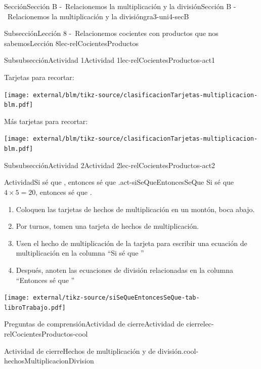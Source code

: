 \begin{sectionptx}{Sección}{Sección B -~Relacionemos la multiplicación y la división}{}{Sección B -~Relacionemos la multiplicación y la división}{}{}{gra3-uni4-secB}
\begin{subsectionptx}{Subsección}{Lección 8 -~Relacionemos cocientes con productos que nos sabemos}{}{Lección 8}{}{}{lec-relCocientesProductos}
\begin{subsubsectionptx}{Subsubsección}{Actividad 1}{}{Actividad 1}{}{}{lec-relCocientesProductos-act1}
\begin{cutoutpage}
Tarjetas para recortar:
\par
\texttt{[image: external/blm/tikz-source/clasificacionTarjetas-multiplicacion-blm.pdf]}
\end{cutoutpage}
\begin{cutoutpage}
Más tarjetas para recortar:
\par
\texttt{[image: external/blm/tikz-source/clasificacionTarjetas-multiplicacion-blm.pdf]}
\par
\end{cutoutpage}
\end{subsubsectionptx}
%
%
\typeout{************************************************}
\typeout{************************************************}
%
\clearpage
\begin{subsubsectionptx}{Subsubsección}{Actividad 2}{}{Actividad 2}{}{}{lec-relCocientesProductos-act2}
\begin{activity}{Actividad}{Si sé que \textellipsis{}, entonces sé que \textellipsis{}.}{act-siSeQueEntoncesSeQue}%
Si sé que \(4 \times 5 = 20\), entonces sé que .%
%
\begin{enumerate}
\item{}Coloquen las tarjetas de hechos de multiplicación en un montón, boca abajo.%
\item{}Por turnos, tomen una tarjeta de hechos de multiplicación.%
\item{}Usen el hecho de multiplicación de la tarjeta para escribir una ecuación de multiplicación en la columna “Si sé que \textellipsis{}”%
\item{}Después, anoten las ecuaciones de división relacionadas en la columna “Entonces sé que   \textellipsis{}”%
\end{enumerate}
\begin{image}{0}{1}{0}{}%
\texttt{[image: external/tikz-source/siSeQueEntoncesSeQue-tab-libroTrabajo.pdf]}
\end{image}%
\end{activity}%
\end{subsubsectionptx}
%
%
\typeout{************************************************}
\typeout{************************************************}
%
\clearpage
\begin{reading-questions-subsubsection}{Preguntas de comprensión}{Actividad de cierre}{}{Actividad de cierre}{}{}{lec-relCocientesProductos-cool}
\begin{project}{Actividad de cierre}{Hechos de multiplicación y de división.}{cool-hechosMultiplicacionDivision}%

\end{project}
\end{reading-questions-subsubsection}
\end{subsectionptx}
\end{sectionptx}
